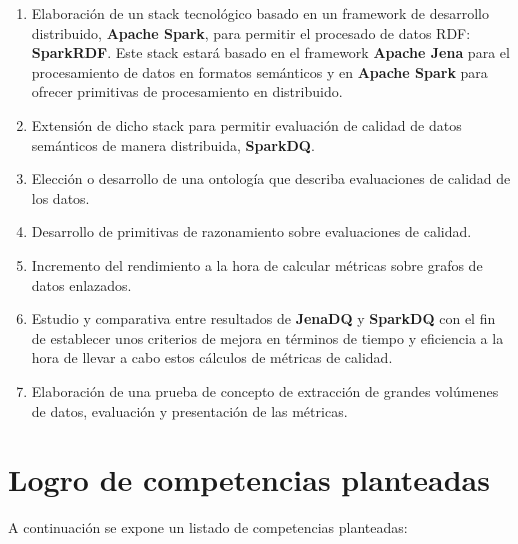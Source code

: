 \begin{enumerate}
  \item Elaboración de un stack tecnológico basado en un framework de desarrollo
    distribuido, \textbf{Apache Spark}, para permitir el procesado de datos RDF:
    \textbf{SparkRDF}. Este stack estará basado en el framework \textbf{Apache
      Jena} para el procesamiento de datos en formatos semánticos y en
    \textbf{Apache Spark} para ofrecer primitivas de procesamiento en
    distribuido.
  \item Extensión de dicho stack para permitir evaluación de calidad de datos
    semánticos de manera distribuida, \textbf{SparkDQ}.
  \item Elección o desarrollo de una ontología que describa evaluaciones de
    calidad de los datos.
  \item Desarrollo de primitivas de razonamiento sobre evaluaciones de
    calidad.
  \item Incremento del rendimiento a la hora de calcular métricas sobre
    grafos de datos enlazados.
  \item Estudio y comparativa entre resultados de \textbf{JenaDQ} y
    \textbf{SparkDQ} con el fin de establecer unos criterios de mejora
    en términos de tiempo y eficiencia a la hora de llevar a cabo
    estos cálculos de métricas de calidad.
  \item Elaboración de una prueba de concepto de extracción de
    grandes volúmenes de datos, evaluación y presentación de las
    métricas.
\end{enumerate}


\section{Logro de competencias planteadas}

A continuación se expone un listado de competencias planteadas:

